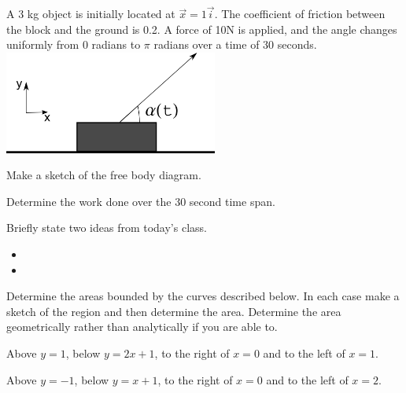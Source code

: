 \begin{problem}
\item A 3 kg object is initially located at $\vec{x}=1\vec{i}$. The
  coefficient of friction between the block and the ground is 0.2. A
  force of 10N is applied, and the angle changes uniformly from 0 radians
  to $\pi$ radians over a time of 30 seconds.\\
  \includegraphics[width=7cm]{ink/week9/workAngleChanging}
  \begin{subproblem}
    \item Make a sketch of the free body diagram.
      \vspace{5em}
    \item Determine the work done over the 30 second time span.
      \vfill
  \end{subproblem}
\end{problem}

\postClass

\begin{problem}
\item Briefly state two ideas from today's class.
  \begin{itemize}
  \item 
  \item 
  \end{itemize}
\item 
  \begin{subproblem}
    \item
  \end{subproblem}
\end{problem}



\begin{problem}
\item Determine the areas bounded by the curves described below. In
  each case make a sketch of the region and then determine the
  area. Determine the area geometrically rather than analytically if
  you are able to.
  \begin{subproblem}
  \item Above $y=1$, below $y=2x+1$, to the right of $x=0$ and to the
    left of $x=1$.
    \vfill
  \item Above $y=-1$, below $y=x+1$, to the right of $x=0$ and to the
    left of $x=2$.
    \vfill
  \end{subproblem}
\end{problem}


